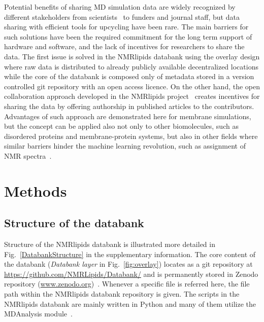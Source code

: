 \documentclass[fleqn,10pt]{wlscirep}
\begin{document}
Potential benefits of sharing MD simulation data are widely recognized by different stakeholders from scientists~\cite{feig99,tai04,silva06,abraham19,hildebrand19,hospital20,abriata20,espigares20} to funders and journal staff, but data sharing with efficient tools for upcycling have been rare. The main barriers for such solutions have been the required commitment for the long term support of hardware and software, and the lack of incentives for researchers to share the data. The first issue is solved in the NMRlipids databank using the overlay design where raw data is distributed to already publicly available decentralized locations while the core of the databank is composed only of metadata stored in a version controlled git repository with an open access licence. On the other hand, the open collaboration approach developed in the NMRlipids project~\cite{botan15} creates incentives for sharing the data by offering authorship in published articles to the contributors. Advantages of such approach are demonstrated here for membrane simulations, but the concept can be applied also not only to other biomolecules, such as disordered proteins and membrane-protein systems, but also in other fields where similar barriers hinder the machine learning revolution, such as assignment of NMR spectra~\cite{klukowski22}. 



\newpage


\section{Methods}


\subsection{Structure of the databank}
Structure of the NMRlipids databank is illustrated more detailed in Fig.~\ref{DatabankStructure} in the supplementary information. The core content of the databank (\textit{Databank layer} in Fig.~\ref{fig:overlay}) locates as a git repository at \url{https://github.com/NMRLipids/Databank/} and is permanently stored in Zenodo repository (\url{www.zenodo.org})~\cite{??}. Whenever a specific file is referred here, the file path within the NMRlipids databank repository is given. The scripts in the NMRlipids databank are mainly written in Python and many of them utilize the MDAnalysis module~\cite{gowers2019mdanalysis,michaud2011mdanalysis}.
\end{document}
